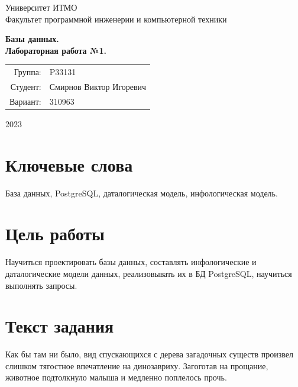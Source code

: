\documentclass{article}
\begin{document}
\begin{titlepage}
    \begin{center}
        \begin{spacing}{1.4}
            \large{Университет ИТМО} \\
            \large{Факультет программной инженерии и компьютерной техники} \\
        \end{spacing}
        \vfill
        \textbf{
            \huge{Базы данных.} \\
            \huge{Лабораторная работа №1.} \\
        }
    \end{center}
    \vfill
    \begin{center}
        \begin{tabular}{r l}
            Группа:  & P33131                  \\
            Студент: & Смирнов Виктор Игоревич \\
            Вариант: & 310963
        \end{tabular}
    \end{center}
    \vfill
    \begin{center}
        \begin{large}
            2023
        \end{large}
    \end{center}
\end{titlepage}

\section*{Ключевые слова}

База данных, PostgreSQL,
даталогическая модель,
инфологическая модель.

\tableofcontents

\section{Цель работы}

Научиться проектировать базы данных,
составлять инфологические и
даталогические модели данных,
реализовывать их в БД
PostgreSQL, научиться выполнять
запросы.

\section{Текст задания}

Как бы там ни было, вид спускающихся с дерева
загадочных существ произвел слишком тягостное
впечатление на динозавриху. Загоготав на
прощание, животное подтолкнуло малыша и
медленно поплелось прочь.
\end{document}
